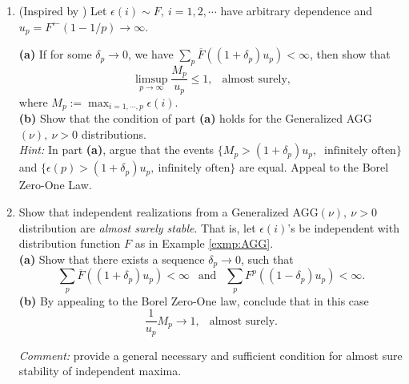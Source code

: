  

\begin{enumerate}

 \item (Inspired by \cite{resnick1973almost}) Let $\epsilon(i)\sim F,\ i=1,2,\cdots$ have arbitrary dependence 
 and $u_p = F^{\leftarrow}(1-1/p) \to \infty$. 
 
 {\bf (a)}   If for some $\delta_p\to 0$,
 we have $\sum_{p} \overline{F}((1+\delta_p)u_p) <\infty$, then show that
 $$
 \limsup_{p\to\infty} \frac{M_p}{u_p} \le 1,\ \ \mbox{ almost surely,} 
 $$
 where $M_p:= \max_{i=1,\cdots,p} \epsilon(i)$.\\
 
 {\bf (b)} Show that the condition of part {\bf (a)} holds for the Generalized AGG$(\nu),\ \nu>0$ distributions.\\
 
 {\em Hint:} In part {\bf (a)}, argue that the events $\{ M_p > (1+\delta_p) u_p,\ \mbox{ infinitely often}\}$ and
  $\{\epsilon(p) > (1+\delta_p)u_p, \ \mbox{infinitely often}\}$ are equal. Appeal to the Borel Zero-One Law.\\
 
 \item  Show that independent realizations from a Generalized AGG$(\nu),\ \nu>0$ distribution
  are {\em almost surely stable}. That is, let $\epsilon(i)$'s be independent with distribution function $F$ as in Example \ref{exmp:AGG}.\\

{\bf (a)} Show that there exists a sequence $\delta_p\to 0$, such that 
$$
\sum_p \overline F((1+\delta_p)u_p) <\infty\ \ \mbox{ and }\ \  \sum_p F^p((1-\delta_p)u_p) <\infty.
$$
 {\bf (b)} By appealing to the Borel Zero-One law, conclude that in this case
 $$
 \frac{1}{u_p} M_p {\longrightarrow} 1,\ \ \mbox{ almost surely}.
 $$

{\em Comment:} 
\cite{resnick1973almost} provide a general necessary and sufficient condition for almost sure stability of independent maxima.\\
 

\end{enumerate}
